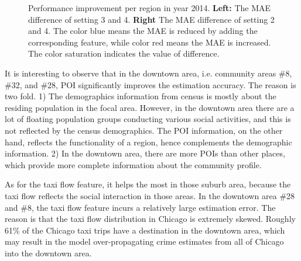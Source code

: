 \begin{figure}[h!]
\centering
{}
\caption{Performance improvement per region in year 2014. \textbf{Left:} The MAE difference of setting 3 and 4. \textbf{Right} The MAE difference of setting 2 and 4. The color blue means the MAE is reduced by adding the corresponding feature, while color red means the MAE is increased. The color saturation indicates the value of difference.}
\label{fig:feat-area}
\end{figure}


It is interesting to observe that in the downtown area, i.e. community areas \#8, \#32, and \#28, POI significantly improves the estimation accuracy. The reason is two fold. 1) The demographics information from census is mostly about the residing population in the focal area.  However, in the downtown area there are a lot of floating population groups conducting various social activities, and this is not reflected by the census demographics. The POI information, on the other hand, reflects the functionality of a region, hence complements the demographic information. 2) In the downtown area, there are more POIs than other places, which provide more complete information about the community profile.

As for the taxi flow feature, it helps the most in those suburb area, because the taxi flow reflects the social interaction in those areas. In the downtown area \#28 and \#8, the taxi flow feature incurs a relatively large estimation error. The reason is that the taxi flow distribution in Chicago is extremely skewed. Roughly 61\% of the Chicago taxi trips have a destination in the downtown area, which may result in the model over-propagating crime estimates from all of Chicago into the downtown area.



